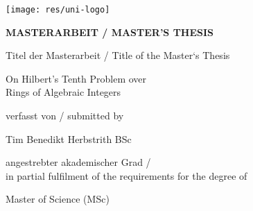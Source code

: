 

\begin{titlepage}
\begin{flushright}
    \texttt{[image: res/uni-logo]}
\end{flushright}
\vspace{0.5cm}

\begin{center}  %
    \Huge{\textsf{\textbf{\MakeUppercase{
        Masterarbeit / Master's Thesis
    }}}}
    \vspace{1.5cm}

    \large{\textsf{  %
        Titel der Masterarbeit / Title of the Master‘s Thesis
    }}
    \vspace{.1cm}

    \LARGE{\textsf{ On Hilbert's Tenth Problem over\\
                    Rings of Algebraic Integers
    }}
    \vfill

    \large{\textsf{  %
        verfasst von / submitted by
    }}

    \Large{\textsf{  Tim Benedikt Herbstrith BSc
    }}
    \vfill

    \large{\textsf{
        angestrebter akademischer Grad /\\ %
        in partial fulfilment of the requirements for the degree of
    }}

    \Large{\textsf{  %
        Master of Science (MSc)
    }}


\end{center}
\end{titlepage}
